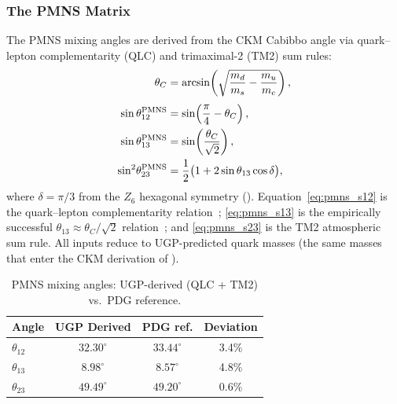 \documentclass[11pt]{article}
\theoremstyle{remark}
\begin{document}
\subsubsection{The PMNS Matrix}
\label{subsec:pmns}

The PMNS mixing angles are derived from the CKM Cabibbo angle via quark--lepton complementarity (QLC) and trimaximal-2 (TM2) sum rules:
\begin{align}
\theta_C &= \arcsin\!\left(\sqrt{\frac{m_d}{m_s} - \frac{m_u}{m_c}}\right), \label{eq:cabibbo}\\[3pt]
\sin\theta_{12}^{\rm PMNS} &= \sin\!\left(\frac{\pi}{4} - \theta_C\right), \label{eq:pmns_s12}\\
\sin\theta_{13}^{\rm PMNS} &= \sin\!\left(\frac{\theta_C}{\sqrt{2}}\right), \label{eq:pmns_s13}\\
\sin^2\!\theta_{23}^{\rm PMNS} &= \frac{1}{2}\bigl(1 + 2\sin\theta_{13}\cos\delta\bigr), \label{eq:pmns_s23}
\end{align}
where $\delta = \pi/3$ from the $Z_6$ hexagonal symmetry ().
Equation~\eqref{eq:pmns_s12} is the quark--lepton complementarity relation~\cite{Raidal2004}; \eqref{eq:pmns_s13} is the empirically successful $\theta_{13} \approx \theta_C/\!\sqrt{2}$ relation~\cite{Antusch2005,King2005}; and \eqref{eq:pmns_s23} is the TM2 atmospheric sum rule.
All inputs reduce to UGP-predicted quark masses (the same masses that enter the CKM derivation of ).

\begin{table}[H]
\centering
\caption{PMNS mixing angles: UGP-derived (QLC + TM2) vs.\ PDG reference.}
\label{tab:pmns}
\renewcommand{\arraystretch}{1.1}
\small
\begin{tabular}{@{}l c c c@{}}
\toprule
\textbf{Angle} & \textbf{UGP Derived} & \textbf{PDG ref.} & \textbf{Deviation} \\
\midrule
$\theta_{12}$ & $32.30^\circ$ & $33.44^\circ$ & 3.4\% \\
$\theta_{13}$ & $8.98^\circ$ & $8.57^\circ$ & 4.8\% \\
$\theta_{23}$ & $49.49^\circ$ & $49.20^\circ$ & 0.6\% \\
\bottomrule
\end{tabular}
\end{table}
\end{document}
